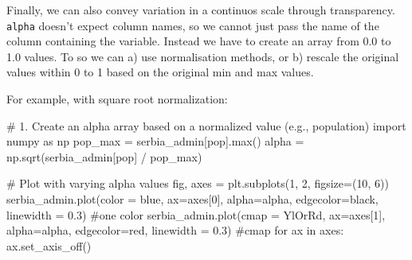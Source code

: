 \documentclass[
  letterpaper,
  DIV=11,
  numbers=noendperiod]{scrreprt}
\newenvironment{Shaded}{\begin{snugshade}}{\end{snugshade}}
\newcommand{\BuiltInTok}[1]{\textcolor[rgb]{0.00,0.23,0.31}{#1}}
\newcommand{\CommentTok}[1]{\textcolor[rgb]{0.37,0.37,0.37}{#1}}
\newcommand{\ControlFlowTok}[1]{\textcolor[rgb]{0.00,0.23,0.31}{#1}}
\newcommand{\DecValTok}[1]{\textcolor[rgb]{0.68,0.00,0.00}{#1}}
\newcommand{\FloatTok}[1]{\textcolor[rgb]{0.68,0.00,0.00}{#1}}
\newcommand{\ImportTok}[1]{\textcolor[rgb]{0.00,0.46,0.62}{#1}}
\newcommand{\KeywordTok}[1]{\textcolor[rgb]{0.00,0.23,0.31}{#1}}
\newcommand{\NormalTok}[1]{\textcolor[rgb]{0.00,0.23,0.31}{#1}}
\newcommand{\OperatorTok}[1]{\textcolor[rgb]{0.37,0.37,0.37}{#1}}
\newcommand{\StringTok}[1]{\textcolor[rgb]{0.13,0.47,0.30}{#1}}
\begin{document}
Finally, we can also convey variation in a continuos scale through
transparency. \texttt{alpha} doesn't expect column names, so we cannot
just pass the name of the column containing the variable. Instead we
have to create an array from 0.0 to 1.0 values. To so we can a) use
normalisation methods, or b) rescale the original values within 0 to 1
based on the original min and max values.

For example, with square root normalization:

\begin{Shaded}
\begin{Highlighting}[]
\CommentTok{\# 1. Create an alpha array based on a normalized value (e.g., population)}
\ImportTok{import}\NormalTok{ numpy }\ImportTok{as}\NormalTok{ np}
\NormalTok{pop\_max }\OperatorTok{=}\NormalTok{ serbia\_admin[}\StringTok{\textquotesingle{}pop\textquotesingle{}}\NormalTok{].}\BuiltInTok{max}\NormalTok{()}
\NormalTok{alpha }\OperatorTok{=}\NormalTok{ np.sqrt(serbia\_admin[}\StringTok{\textquotesingle{}pop\textquotesingle{}}\NormalTok{] }\OperatorTok{/}\NormalTok{ pop\_max) }
\end{Highlighting}
\end{Shaded}

\begin{Shaded}
\begin{Highlighting}[]
\CommentTok{\# Plot with varying alpha values}
\NormalTok{fig, axes }\OperatorTok{=}\NormalTok{ plt.subplots(}\DecValTok{1}\NormalTok{, }\DecValTok{2}\NormalTok{, figsize}\OperatorTok{=}\NormalTok{(}\DecValTok{10}\NormalTok{, }\DecValTok{6}\NormalTok{))}
\NormalTok{serbia\_admin.plot(color }\OperatorTok{=} \StringTok{\textquotesingle{}blue\textquotesingle{}}\NormalTok{, ax}\OperatorTok{=}\NormalTok{axes[}\DecValTok{0}\NormalTok{], alpha}\OperatorTok{=}\NormalTok{alpha, edgecolor}\OperatorTok{=}\StringTok{\textquotesingle{}black\textquotesingle{}}\NormalTok{, linewidth }\OperatorTok{=} \FloatTok{0.3}\NormalTok{) }\CommentTok{\#one color}
\NormalTok{serbia\_admin.plot(cmap }\OperatorTok{=} \StringTok{\textquotesingle{}YlOrRd\textquotesingle{}}\NormalTok{, ax}\OperatorTok{=}\NormalTok{axes[}\DecValTok{1}\NormalTok{], alpha}\OperatorTok{=}\NormalTok{alpha, edgecolor}\OperatorTok{=}\StringTok{\textquotesingle{}red\textquotesingle{}}\NormalTok{, linewidth }\OperatorTok{=} \FloatTok{0.3}\NormalTok{) }\CommentTok{\#cmap}
\ControlFlowTok{for}\NormalTok{ ax }\KeywordTok{in}\NormalTok{ axes:}
\NormalTok{    ax.set\_axis\_off()}
\end{Highlighting}
\end{Shaded}
\end{document}
